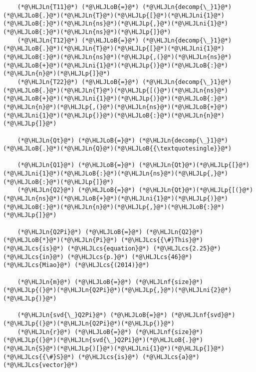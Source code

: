 \documentclass[12pt,a4paper]{article}
\newcommand{\HLJLn}[1]{#1}
\newcommand{\HLJLnf}[1]{\textcolor[RGB]{66,102,213}{#1}}
\newcommand{\HLJLni}[1]{\textcolor[RGB]{59,151,46}{#1}}
\newcommand{\HLJLoB}[1]{\textcolor[RGB]{102,102,102}{\textbf{#1}}}
\newcommand{\HLJLp}[1]{#1}
\newcommand{\HLJLcs}[1]{\textcolor[RGB]{153,153,119}{\textit{#1}}}
\begin{document}
\begin{lstlisting}
    (*@\HLJLn{T11}@*) (*@\HLJLoB{=}@*) (*@\HLJLn{decomp{\_}1}@*)(*@\HLJLoB{.}@*)(*@\HLJLn{T}@*)(*@\HLJLp{[}@*)(*@\HLJLni{1}@*)(*@\HLJLoB{:}@*)(*@\HLJLn{ns}@*)(*@\HLJLp{,}@*)(*@\HLJLni{1}@*)(*@\HLJLoB{:}@*)(*@\HLJLn{ns}@*)(*@\HLJLp{]}@*)
    (*@\HLJLn{T12}@*) (*@\HLJLoB{=}@*) (*@\HLJLn{decomp{\_}1}@*)(*@\HLJLoB{.}@*)(*@\HLJLn{T}@*)(*@\HLJLp{[}@*)(*@\HLJLni{1}@*)(*@\HLJLoB{:}@*)(*@\HLJLn{ns}@*)(*@\HLJLp{,(}@*)(*@\HLJLn{ns}@*)(*@\HLJLoB{+}@*)(*@\HLJLni{1}@*)(*@\HLJLp{)}@*)(*@\HLJLoB{:}@*)(*@\HLJLn{n}@*)(*@\HLJLp{]}@*)
    (*@\HLJLn{T22}@*) (*@\HLJLoB{=}@*) (*@\HLJLn{decomp{\_}1}@*)(*@\HLJLoB{.}@*)(*@\HLJLn{T}@*)(*@\HLJLp{[(}@*)(*@\HLJLn{ns}@*)(*@\HLJLoB{+}@*)(*@\HLJLni{1}@*)(*@\HLJLp{)}@*)(*@\HLJLoB{:}@*)(*@\HLJLn{n}@*)(*@\HLJLp{,(}@*)(*@\HLJLn{ns}@*)(*@\HLJLoB{+}@*)(*@\HLJLni{1}@*)(*@\HLJLp{)}@*)(*@\HLJLoB{:}@*)(*@\HLJLn{n}@*)(*@\HLJLp{]}@*)

    (*@\HLJLn{Qt}@*) (*@\HLJLoB{=}@*) (*@\HLJLn{decomp{\_}1}@*)(*@\HLJLoB{.}@*)(*@\HLJLn{Q}@*)(*@\HLJLoB{{\textquotesingle}}@*)

    (*@\HLJLn{Q1}@*) (*@\HLJLoB{=}@*) (*@\HLJLn{Qt}@*)(*@\HLJLp{[}@*)(*@\HLJLni{1}@*)(*@\HLJLoB{:}@*)(*@\HLJLn{ns}@*)(*@\HLJLp{,}@*)(*@\HLJLoB{:}@*)(*@\HLJLp{]}@*)
    (*@\HLJLn{Q2}@*) (*@\HLJLoB{=}@*) (*@\HLJLn{Qt}@*)(*@\HLJLp{[(}@*)(*@\HLJLn{ns}@*)(*@\HLJLoB{+}@*)(*@\HLJLni{1}@*)(*@\HLJLp{)}@*)(*@\HLJLoB{:}@*)(*@\HLJLn{n}@*)(*@\HLJLp{,}@*)(*@\HLJLoB{:}@*)(*@\HLJLp{]}@*)

    (*@\HLJLn{Q2Pi}@*) (*@\HLJLoB{=}@*) (*@\HLJLn{Q2}@*)(*@\HLJLoB{*}@*)(*@\HLJLn{Pi}@*) (*@\HLJLcs{{\#}This}@*) (*@\HLJLcs{is}@*) (*@\HLJLcs{equation}@*) (*@\HLJLcs{2.25}@*) (*@\HLJLcs{in}@*) (*@\HLJLcs{p.}@*) (*@\HLJLcs{46}@*) (*@\HLJLcs{Miao}@*) (*@\HLJLcs{(2014)}@*)

    (*@\HLJLn{m}@*) (*@\HLJLoB{=}@*) (*@\HLJLnf{size}@*)(*@\HLJLp{(}@*)(*@\HLJLn{Q2Pi}@*)(*@\HLJLp{,}@*)(*@\HLJLni{2}@*)(*@\HLJLp{)}@*)

    (*@\HLJLn{svd{\_}Q2Pi}@*) (*@\HLJLoB{=}@*) (*@\HLJLnf{svd}@*)(*@\HLJLp{(}@*)(*@\HLJLn{Q2Pi}@*)(*@\HLJLp{)}@*)
    (*@\HLJLn{r}@*) (*@\HLJLoB{=}@*) (*@\HLJLnf{size}@*)(*@\HLJLp{(}@*)(*@\HLJLn{svd{\_}Q2Pi}@*)(*@\HLJLoB{.}@*)(*@\HLJLn{S}@*)(*@\HLJLp{)[}@*)(*@\HLJLni{1}@*)(*@\HLJLp{]}@*) (*@\HLJLcs{{\#}S}@*) (*@\HLJLcs{is}@*) (*@\HLJLcs{a}@*) (*@\HLJLcs{vector}@*)


\end{lstlisting}
\end{document}
